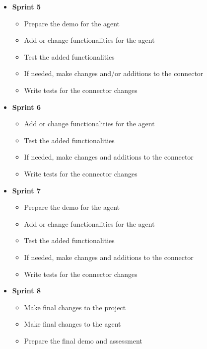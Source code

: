 \begin{itemize}
\item\textbf{Sprint 5}

\begin{itemize}
  \item Prepare the demo for the agent
  \item Add or change functionalities for the agent
  \item Test the added functionalities
  \item If needed, make changes and/or additions to the connector
  \item Write tests for the connector changes
\end{itemize}


\item\textbf{Sprint 6}

\begin{itemize}
  \item Add or change functionalities for the agent
  \item Test the added functionalities
  \item If needed, make changes and additions to the connector
  \item Write tests for the connector changes
\end{itemize}


\item\textbf{Sprint 7}

\begin{itemize}
  \item Prepare the demo for the agent
  \item Add or change functionalities for the agent
  \item Test the added functionalities
  \item If needed, make changes and additions to the connector
  \item Write tests for the connector changes
\end{itemize}

\item\textbf{Sprint 8}
\begin{itemize}
  \item Make final changes to the project
  \item Make final changes to the agent
  \item Prepare the final demo and assessment
\end{itemize}
\end{itemize}

